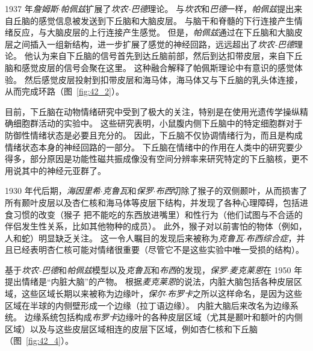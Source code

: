 1937 年\textit{詹姆斯$\cdot$帕佩兹}扩展了\textit{坎农-巴德}理论。
与\textit{坎农}和\textit{巴德}一样，\textit{帕佩兹}提出来自丘脑的感觉信息被发送到下丘脑和大脑皮层。
与脑干和脊髓的下行连接产生情绪反应，与大脑皮层的上行连接产生感觉。
但是，\textit{帕佩兹}通过在下丘脑和大脑皮层之间插入一组新结构，进一步扩展了感觉的神经回路，远远超出了\textit{坎农-巴德}理论。
他认为来自下丘脑的信号首先到达丘脑前部，然后到达扣带皮层，来自下丘脑和感觉皮层的信号会聚在这里。
这种融合解释了帕佩斯理论中有意识的感觉体验。
然后感觉皮层投射到扣带皮层和海马体，海马体又与下丘脑的乳头体连接，从而完成环路（图~\ref{fig:42_2}）。


目前，下丘脑在动物情绪研究中受到了极大的关注，特别是在使用光遗传学操纵精确细胞群活动的实验中。
这些研究表明，小鼠腹内侧下丘脑中的特定细胞群对于防御性情绪状态是必要且充分的。
因此，下丘脑不仅协调情绪行为，而且是构成情绪状态本身的神经回路的一部分。
下丘脑在情绪中的作用在人类中的研究要少得多，部分原因是功能性磁共振成像没有空间分辨率来研究特定的下丘脑核，更不用说其中的神经元亚群了。


1930 年代后期，\textit{海因里希$\cdot$克鲁瓦}和\textit{保罗$\cdot$布西}切除了猴子的双侧颞叶，从而损害了所有颞叶皮层以及杏仁核和海马体等皮层下结构，并发现了各种心理障碍，包括进食习惯的改变（猴子 把不能吃的东西放进嘴里）和性行为（他们试图与不合适的伴侣发生性关系，比如其他物种的成员）。
此外，猴子对以前害怕的物体（例如，人和蛇）明显缺乏关注。
这一令人瞩目的发现后来被称为\textit{克鲁瓦$\cdot$布西综合症}，并且已经表明杏仁核可能对情绪很重要（尽管它不是这些实验中唯一受损的结构）。


基于\textit{坎农-巴德}和\textit{帕佩兹}模型以及\textit{克鲁瓦}和\textit{布西}的发现，\textit{保罗$\cdot$麦克莱恩}在 1950 年提出情绪是“内脏大脑”的产物。
根据\textit{麦克莱恩}的说法，内脏大脑包括各种皮层区域，这些区域长期以来被称为边缘叶，\textit{保尔$\cdot$布罗卡}之所以这样命名，是因为这些区域在半球的内侧壁形成一个边缘（拉丁语边缘）。
内脏大脑后来改名为边缘系统。
边缘系统包括构成\textit{布罗卡}边缘叶的各种皮层区域（尤其是颞叶和额叶的内侧区域）以及与这些皮层区域相连的皮层下区域，例如杏仁核和下丘脑（图~\ref{fig:42_4}）。


